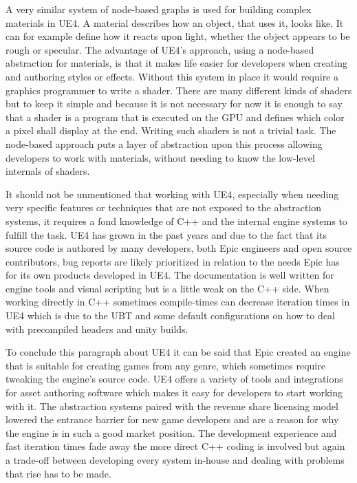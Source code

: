 \noindent
A very similar system of node-based graphs is used for building complex materials in \ac{UE4}. A material describes how an object, that uses it, looks like. It can for example define how it reacts upon light, whether the object appears to be rough or specular. The advantage of \ac{UE4}'s approach, using a node-based abstraction for materials, is that it makes life easier for developers when creating and authoring styles or effects. Without this system in place it would require a graphics programmer to write a shader. There are many different kinds of shaders but to keep it simple and because it is not necessary for now it is enough to say that a shader is a program that is executed on the \ac{GPU} and defines which color a pixel shall display at the end. Writing such shaders is not a trivial task. The node-based approach puts a layer of abstraction upon this process allowing developers to work with materials, without needing to know the low-level internals of shaders.

It should not be unmentioned that working with \ac{UE4}, especially when needing very specific features or techniques that are not exposed to the abstraction systems, it requires a fond knowledge of C++ and the internal engine systems to fulfill the task. \ac{UE4} has grown in the past years and due to the fact that its source code is authored by many developers, both Epic engineers and open source contributors, bug reports are likely prioritized in relation to the needs Epic has for its own products developed in \ac{UE4}. The documentation is well written for engine tools and visual scripting but is a little weak on the C++ side. When working directly in C++ sometimes compile-times can decrease iteration times in \ac{UE4} which is due to the \ac{UBT} and some default configurations on how to deal with precompiled headers and unity builds.

To conclude this paragraph about \ac{UE4} it can be said that Epic created an engine that is suitable for creating games from any genre, which sometimes require tweaking the engine's source code. \ac{UE4} offers a variety of tools and integrations for asset authoring software which makes it easy for developers to start working with it. The abstraction systems paired with the revenue share licensing model lowered the entrance barrier for new game developers and are a reason for why the engine is in such a good market position. The development experience and fast iteration times fade away the more direct C++ coding is involved but again a trade-off between developing every system in-house and dealing with problems that rise has to be made.

